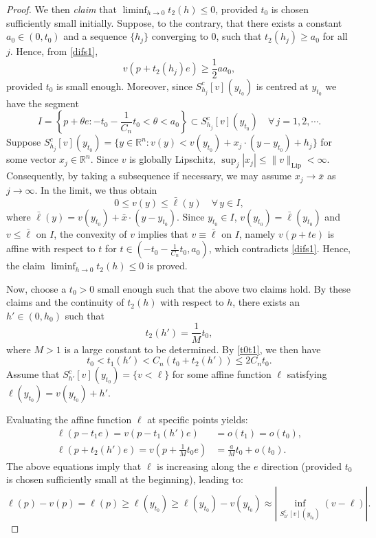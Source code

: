 \documentclass[11pt]{amsart}
\theoremstyle{plain}
\newcommand{\0}{\textbf{0}}
\numberwithin{equation}{section}
\numberwithin{equation}{section}
\numberwithin{figure}{section}
\begin{document}
\begin{proof}
We then \emph{claim} that \(\liminf_{h\rightarrow 0}t_2(h)\leq 0\), provided $t_0$ is chosen sufficiently small initially. 
Suppose, to the contrary, that there exists a constant \(a_0 \in (0, t_0)\) and a sequence \(\{h_j\}\) converging to \(0\), such that \(t_2(h_j) \geq a_0\) for all \(j\). Hence, from \eqref{difs1},
\begin{equation}\label{t2hj}
v(p+t_2(h_j)e)\geq \frac{1}{2}aa_0,
\end{equation}
provided \(t_0\) is small enough.
Moreover, since $S^c_{h_j}[v](y_{t_0})$ is centred at $y_{t_0}$ we have the segment 
\begin{equation}
I=\left\{p+\theta e: -t_0-\frac{1}{C_n}t_0<\theta<a_0\right\} \subset S^c_{h_j}[v](y_{t_0})\quad\forall\,j=1,2,\cdots.
\end{equation}
Suppose \(S^c_{h_j}[v](y_{t_0})=\{y\in\mathbb{R}^n: v(y)<v(y_{t_0})+x_j\cdot (y-y_{t_0})+h_j\}\) for some vector \(x_j\in \mathbb{R}^n\).
Since \(v\) is globally Lipschitz, \( \sup_j |x_j| \leq \|v\|_{\text{Lip}} < \infty \). Consequently, by taking a subsequence if necessary, we may assume \(x_j \to \bar{x}\) as \(j \to \infty\).
In the limit, we thus obtain 
	\[ 0 \leq v(y) \leq \bar{\ell}(y) \quad \forall\, y \in I, \] 
where \( \bar{\ell}(y) = v(y_{t_0}) + \bar{x} \cdot (y - y_{t_0}) \). 
Since \(y_{t_0} \in I\), \(v(y_{t_0}) = \bar{\ell}(y_{t_0})\) and \(v \leq \bar{\ell}\) on \(I\), the convexity of \(v\) implies that \(v \equiv \bar{\ell}\) on \(I\), namely \(v(p + te)\) is affine with respect to \(t\) for \(t \in (-t_0 - \frac{1}{C_n}t_0, a_0)\), which contradicts \eqref{difs1}. 
Hence, the claim $\liminf_{h \to 0} t_2(h) \leq 0$ is proved.



Now, choose a $t_0>0$ small enough such that the above two claims hold. By these claims and the continuity of \(t_2(h)\) with respect to \(h\), there exists an \(h'\in(0, h_0)\) such that 
\begin{equation}
t_2(h') = \frac{1}{M}t_0,
\end{equation}
where \(M > 1\) is a large constant to be determined.
By \eqref{t0t1}, we then have 
\begin{equation}
t_0 < t_1(h') < C_n(t_0 + t_2(h')) \leq 2C_nt_0.
\end{equation}
Assume that \(S^c_{h'}[v](y_{t_0}) = \{v < \ell\}\) for some affine function \(\ell\) satisfying \(\ell(y_{t_0}) = v(y_{t_0}) + h'\).


Evaluating the affine function \(\ell\) at specific points yields:
\begin{align}
\ell(p - t_1e) = v(p - t_1(h')e) &= o(t_1) = o(t_0), \\
\ell\left(p + t_2(h')e\right) = v\left(p + \frac{1}{M}t_0e\right) &= \frac{a}{M}t_0 + o(t_0).
\end{align}
The above equations imply that \(\ell\) is increasing along the \(e\) direction (provided $t_0$ is chosen sufficiently small at the beginning), leading to:
\begin{equation}\label{makec1}
\ell(p) - v(p) = \ell(p) \geq \ell(y_{t_0}) \geq \ell(y_{t_0}) - v(y_{t_0}) \approx \left| \inf_{S^c_{h'}[v](y_{t_0})} (v - \ell) \right|.
\end{equation}


\end{proof}
\end{document}
